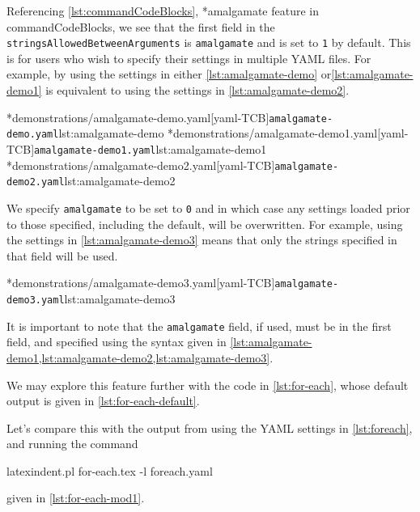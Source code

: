 	Referencing \vref{lst:commandCodeBlocks},%
	*{amalgamate feature in commandCodeBlocks}, we see that the first field in the \texttt{stringsAllowedBetweenArguments} is
	\texttt{amalgamate} and is set to \texttt{1} by default. This is for
	users who wish to specify their settings in multiple YAML files. For example, by using
	the settings in either \cref{lst:amalgamate-demo} or\cref{lst:amalgamate-demo1} is equivalent to
	using the settings in \cref{lst:amalgamate-demo2}.

	\begin{cmhtcbraster}[raster columns=3,
			raster left skip=-3.5cm,
			raster right skip=-2cm,
			raster column skip=.03\linewidth]
		\cmhlistingsfromfile[style=yaml-LST]*{demonstrations/amalgamate-demo.yaml}[yaml-TCB]{\texttt{amalgamate-demo.yaml}}{lst:amalgamate-demo}
		\cmhlistingsfromfile[style=yaml-LST]*{demonstrations/amalgamate-demo1.yaml}[yaml-TCB]{\texttt{amalgamate-demo1.yaml}}{lst:amalgamate-demo1}
		\cmhlistingsfromfile[style=yaml-LST]*{demonstrations/amalgamate-demo2.yaml}[yaml-TCB]{\texttt{amalgamate-demo2.yaml}}{lst:amalgamate-demo2}
	\end{cmhtcbraster}

	We specify \texttt{amalgamate} to be set to \texttt{0} and in which case
	any settings loaded prior to those specified, including the default, will be overwritten.
	For example, using the settings in \cref{lst:amalgamate-demo3} means that only the strings
	specified in that field will be used.

	\cmhlistingsfromfile[style=yaml-LST]*{demonstrations/amalgamate-demo3.yaml}[yaml-TCB]{\texttt{amalgamate-demo3.yaml}}{lst:amalgamate-demo3}

	It is important to note that the \texttt{amalgamate} field, if used, must be in the
	first field, and specified using the syntax given in \cref{lst:amalgamate-demo1,lst:amalgamate-demo2,lst:amalgamate-demo3}.

	We may explore this feature further with the code in \cref{lst:for-each}, whose
	default output is given in \cref{lst:for-each-default}.

	\begin{cmhtcbraster}[raster column skip=.1\linewidth]
	\end{cmhtcbraster}

	Let's compare this with the output from using the YAML settings in
	\cref{lst:foreach}, and running the command
	\begin{commandshell}
latexindent.pl for-each.tex -l foreach.yaml  
\end{commandshell}
	given in \cref{lst:for-each-mod1}.

